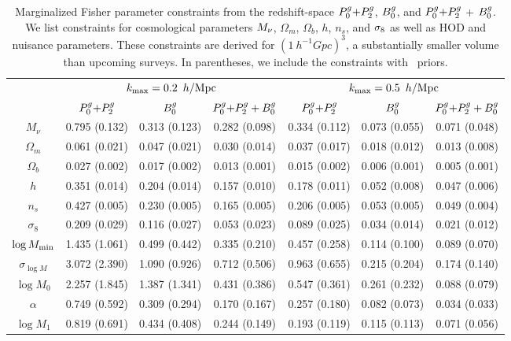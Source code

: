 \begin{table}
    \caption{Marginalized Fisher parameter constraints from the redshift-space 
    $P^g_0{+}P^g_2$, $B^g_0$, and $P^g_0{+}P^g_2$ + $B^g_0$. We list constraints for cosmological 
    parameters $M_\nu$, $\Omega_m$, $\Omega_b$, $h$, $n_s$, and $\sigma_8$ as well 
    as HOD and nuisance parameters.  These constraints are derived for
    $(1~h^{-1}Gpc)^3$, a substantially smaller volume than upcoming surveys.
    In parentheses, we include the constraints with \planck~priors.
    } 
\begin{center} 
    \begin{tabular}{c|ccc|ccc} \hline
        & \multicolumn{3}{c}{$k_{\rm max}=0.2~\,h/\mathrm{Mpc}$} & \multicolumn{3}{c}{$k_{\rm max}=0.5~\,h/\mathrm{Mpc}$} \\ %
        & $P^g_0{+}P^g_2$ & $B^g_0$ & $P^g_0{+}P^g_2 + B^g_0$ & $P^g_0{+}P^g_2$ & $B^g_0$ & $P^g_0{+}P^g_2 + B^g_0$ \\[3pt] \hline 
$M_\nu$     &  0.795 (0.132) & 0.313 (0.123) & 0.282 (0.098) & 0.334 (0.112) & 0.073 (0.055) & 0.071 (0.048)  \\
$\Omega_m$  &  0.061 (0.021) & 0.047 (0.021) & 0.030 (0.014) & 0.037 (0.017) & 0.018 (0.012) & 0.013 (0.008)  \\
$\Omega_b$  &  0.027 (0.002) & 0.017 (0.002) & 0.013 (0.001) & 0.015 (0.002) & 0.006 (0.001) & 0.005 (0.001)  \\
$h$         &  0.351 (0.014) & 0.204 (0.014) & 0.157 (0.010) & 0.178 (0.011) & 0.052 (0.008) & 0.047 (0.006)  \\
$n_s$       &  0.427 (0.005) & 0.230 (0.005) & 0.165 (0.005) & 0.206 (0.005) & 0.053 (0.005) & 0.049 (0.004)  \\
$\sigma_8$  &  0.209 (0.029) & 0.116 (0.027) & 0.053 (0.023) & 0.089 (0.025) & 0.034 (0.014) & 0.021 (0.012)  \\ [3pt] \hline
$\log M_{\rm min}$ &  1.435 (1.061) & 0.499 (0.442) & 0.335 (0.210) & 0.457 (0.258) & 0.114 (0.100) & 0.089 (0.070)  \\
$\sigma_{\log M}$ &  3.072 (2.390) & 1.090 (0.926) & 0.712 (0.506) & 0.963 (0.655) & 0.215 (0.204) & 0.174 (0.140)  \\
$\log M_0$ &  2.257 (1.845) & 1.387 (1.341) & 0.431 (0.386) & 0.547 (0.361) & 0.261 (0.232) & 0.088 (0.079)  \\
$\alpha$ &  0.749 (0.592) & 0.309 (0.294) & 0.170 (0.167) & 0.257 (0.180) & 0.082 (0.073) & 0.034 (0.033)  \\
$\log M_1$ &  0.819 (0.691) & 0.434 (0.408) & 0.244 (0.149) & 0.193 (0.119) & 0.115 (0.113) & 0.071 (0.056)  \\
        [3pt]
\hline                                 
\end{tabular} \label{tab:forecast}
\end{center}
\end{table}

